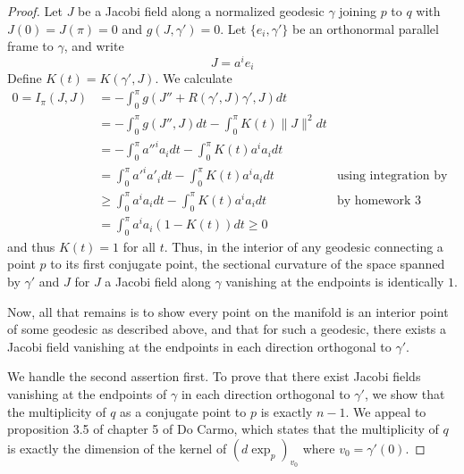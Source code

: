 \documentclass[fontsize=11pt]{scrartcl} %
\numberwithin{equation}{section} %
\numberwithin{figure}{section} %
\numberwithin{table}{section} %
\begin{document}
\begin{proof}
    Let $J$ be a Jacobi field along a normalized geodesic $\gamma$ joining $p$
    to $q$ with $J(0)=J(\pi)=0$ and $g(J,\gamma')=0$. Let $\{e_i,\gamma'\}$ be
    an orthonormal parallel frame to $\gamma$, and write
    \[
        J = a^ie_i
    \]
    Define $K(t) = K(\gamma',J)$. We calculate
    \[
\begin{aligned}
    0 = I_{\pi}(J,J) &= -\int_0^{\pi}g(J'' + R(\gamma',J)\gamma',J)dt\\
    &= -\int_0^{\pi}g(J'',J)dt -\int_0^{\pi}K(t)\|J\|^2dt\\
    &= -\int_0^{\pi}a''^ia_idt - \int_0^{\pi}K(t)a^ia_idt\\
    &= \int_0^{\pi}a'^ia'_idt - \int_0^{\pi}K(t)a^ia_idt &\text{using
    integration by parts}\\
    &\geq \int_0^{\pi}a^ia_idt - \int_0^{\pi}K(t)a^ia_idt &\text{by homework 3
    problem 1}\\
    &=\int_0^{\pi}a^ia_i(1-K(t))dt\geq 0
\end{aligned}
    \]
    and thus $K(t)=1$ for all $t$. Thus, in the interior of any geodesic
    connecting a point $p$ to its first conjugate point, the sectional curvature
    of the space spanned by $\gamma'$ and $J$ for $J$ a Jacobi field along
    $\gamma$ vanishing at the endpoints is identically $1$.

    Now, all that remains is to show every point on the manifold is an interior
    point of some geodesic as described above, and that for such a geodesic,
    there exists a Jacobi field vanishing at the endpoints in each direction
    orthogonal to $\gamma'$.

    We handle the second assertion first. To prove that there exist Jacobi
    fields vanishing at the endpoints of $\gamma$ in each direction orthogonal
    to $\gamma'$, we show that the multiplicity of $q$ as a conjugate point to
    $p$ is exactly $n-1$. We appeal to proposition 3.5 of chapter 5 of Do Carmo,
    which states that the multiplicity of $q$ is exactly the dimension of the
    kernel of $(d\exp_p)_{v_0}$ where $v_0 = \gamma'(0)$.


\end{proof}
\end{document}
